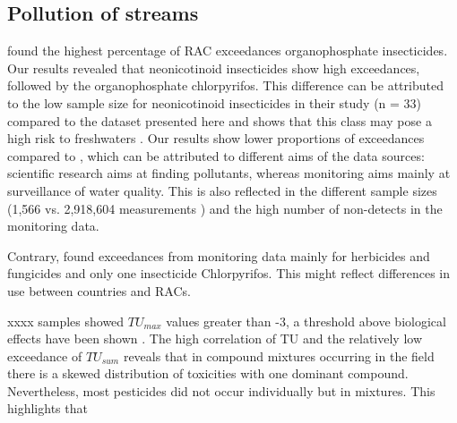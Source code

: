 \documentclass[journal=esthag,manuscript=article]{achemso}
\begin{document}








\subsection{Pollution of streams}


\citet{stehle_pesticide_2015} found the highest percentage of RAC exceedances organophosphate insecticides. 
Our results revealed that neonicotinoid insecticides show high exceedances, followed by the organophosphate chlorpyrifos. 
This difference can be attributed to the low sample size for neonicotinoid insecticides in their study (n = 33) compared to the dataset presented here  and shows that this class may pose a high risk to freshwaters .
Our results show lower proportions of exceedances compared to \citet{stehle_pesticide_2015}, which can be attributed to different aims of the data sources: scientific research aims at finding pollutants, whereas monitoring aims mainly at surveillance of water quality. 
This is also reflected in the different sample sizes (1,566 vs. 2,918,604 measurements ) and the high number of non-detects in the monitoring data.

Contrary, \citet{knauer_pesticides_2016} found exceedances from monitoring data mainly for herbicides and fungicides and only one insecticide Chlorpyrifos.
This might reflect differences in use between countries and RACs.


xxxx samples showed $TU_{max}$ values greater than -3, a threshold above biological effects have been shown . 
The high correlation of TU and the relatively low exceedance of $TU_{sum}$ reveals that in compound mixtures occurring in the field there is a skewed distribution of toxicities with one dominant compound.
Nevertheless, most pesticides did not occur individually but in mixtures.
This highlights that 





\end{document}
